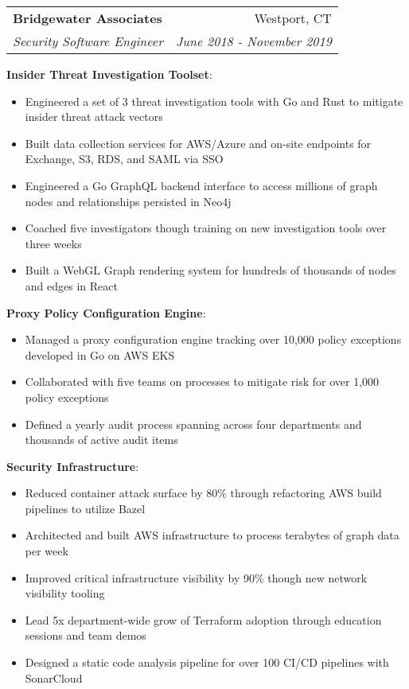 \documentclass[a4paper]{article}
\makeatletter
\newcommand{\resumeItemNoBullet}[2]{
	\textbf{#1}{: #2 \vspace{-2pt}}
}
\newcommand{\resumeSubheading}[4]{
  \vspace{-1pt}\item
    \begin{tabular*}{0.97\textwidth}[t]{l@{\extracolsep{\fill}}r}
      \textbf{#1} & #2 \\
      \textit{\small#3} & \textit{\small #4} \\
    \end{tabular*}\vspace{-5pt}
}
\makeatother
\begin{document}
	\resumeSubheading
	{Bridgewater Associates}{Westport, CT}
	{Security Software Engineer}{June 2018 - November 2019}
		\begin{itemize}[leftmargin=4pt]
			\vspace{7pt}
			\resumeItemNoBullet{Insider Threat Investigation Toolset}{}
				\begin{itemize}
					\item Engineered a set of 3 threat investigation tools with Go and Rust to mitigate insider threat attack vectors
					\item Built data collection services for AWS/Azure and on-site endpoints for Exchange, S3, RDS, and SAML via SSO
					\item Engineered a Go GraphQL backend interface to access millions of graph nodes and relationships persisted in Neo4j
					\item Coached five investigators though training on new investigation tools over three weeks
					\item Built a WebGL Graph rendering system for hundreds of thousands of nodes and edges in React
				\end{itemize}

			\resumeItemNoBullet{Proxy Policy Configuration Engine}{}
				\begin{itemize}
					\item Managed a proxy configuration engine tracking over 10,000 policy exceptions developed in Go on AWS EKS
					\item Collaborated with five teams on processes to mitigate risk for over 1,000 policy exceptions
					\item Defined a yearly audit process spanning across four departments and thousands of active audit items
				\end{itemize}

			\resumeItemNoBullet{Security Infrastructure}{}
				\begin{itemize}
					\item Reduced container attack surface by 80\% through refactoring AWS build pipelines to utilize Bazel
					\item Architected and built AWS infrastructure to process terabytes of graph data per week
					\item Improved critical infrastructure visibility by 90\% though new network visibility tooling
					\item Lead 5x department-wide grow of Terraform adoption through education sessions and team demos
					\item Designed a static code analysis pipeline for over 100 CI/CD pipelines with SonarCloud
				\end{itemize}
		\end{itemize}
\end{document}
